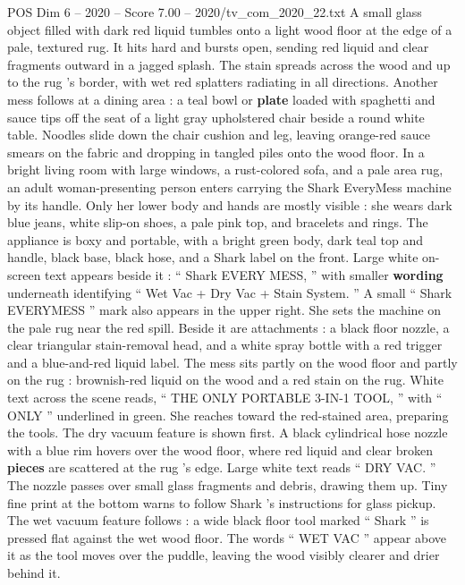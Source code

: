 \begin{textsample}{POS Dim 6 – 2020 – Score 7.00 – 2020/tv\_com\_2020\_22.txt}  \label{ex:f6_pos_067}
A small glass object filled with dark red liquid tumbles onto a light wood floor at the edge of a pale, textured rug.
It hits hard and bursts open, sending red liquid and clear fragments outward in a jagged splash.
The stain spreads across the wood and up to the rug ’s border, with wet red splatters radiating in all directions.
Another mess follows at a dining area : a teal bowl or \textbf{plate} loaded with spaghetti and sauce tips off the seat of a light gray upholstered chair beside a round white table.
Noodles slide down the chair cushion and leg, leaving orange-red sauce smears on the fabric and dropping in tangled piles onto the wood floor.
In a bright living room with large windows, a rust-colored sofa, and a pale area rug, an adult woman-presenting person enters carrying the Shark EveryMess machine by its handle.
Only her lower body and hands are mostly visible : she wears dark blue jeans, white slip-on shoes, a pale pink top, and bracelets and rings.
The appliance is boxy and portable, with a bright green body, dark teal top and handle, black base, black hose, and a Shark label on the front.
Large white on-screen text appears beside it : “ Shark EVERY MESS, ” with smaller \textbf{wording} underneath identifying “ Wet Vac + Dry Vac + Stain System. ” A small “ Shark EVERYMESS ” mark also appears in the upper right.
She sets the machine on the pale rug near the red spill.
Beside it are attachments : a black floor nozzle, a clear triangular stain-removal head, and a white spray bottle with a red trigger and a blue-and-red liquid label.
The mess sits partly on the wood floor and partly on the rug : brownish-red liquid on the wood and a red stain on the rug.
White text across the scene reads, “ THE ONLY PORTABLE 3-IN-1 TOOL, ” with “ ONLY ” underlined in green.
She reaches toward the red-stained area, preparing the tools.
The dry vacuum feature is shown first.
A black cylindrical hose nozzle with a blue rim hovers over the wood floor, where red liquid and clear broken \textbf{pieces} are scattered at the rug ’s edge.
Large white text reads “ DRY VAC. ” The nozzle passes over small glass fragments and debris, drawing them up.
Tiny fine print at the bottom warns to follow Shark ’s instructions for glass pickup.
The wet vacuum feature follows : a wide black floor tool marked “ Shark ” is pressed flat against the wet wood floor.
The words “ WET VAC ” appear above it as the tool moves over the puddle, leaving the wood visibly clearer and drier behind it.

\end{textsample}
